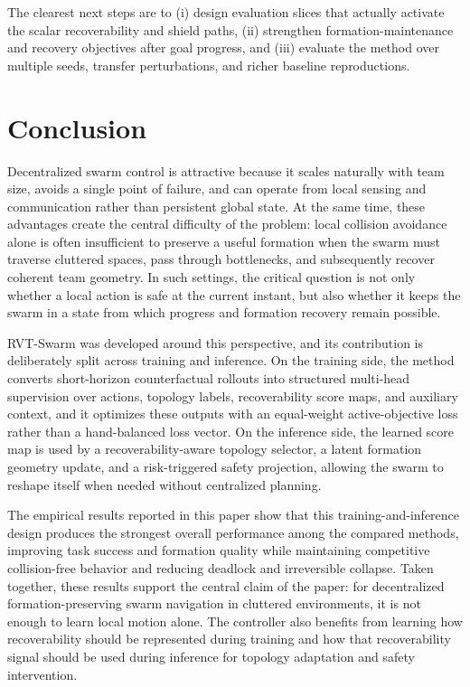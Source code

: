 \documentclass[journal]{IEEEtran}
\begin{document}
The clearest next steps are to (i) design evaluation slices that
actually activate the scalar recoverability and shield paths,
(ii) strengthen formation-maintenance and recovery objectives after goal
progress, and (iii) evaluate the method over multiple seeds, transfer
perturbations, and richer baseline reproductions.

\section{Conclusion}
\label{sec:conclusion}

Decentralized swarm control is attractive because it scales naturally
with team size, avoids a single point of failure, and can operate from
local sensing and communication rather than persistent global state.
At the same time, these advantages create the central difficulty of the
problem: local collision avoidance alone is often insufficient to
preserve a useful formation when the swarm must traverse cluttered
spaces, pass through bottlenecks, and subsequently recover coherent team
geometry. In such settings, the critical question is not only whether a
local action is safe at the current instant, but also whether it keeps
the swarm in a state from which progress and formation recovery remain
possible.

RVT-Swarm was developed around this perspective, and its contribution
is deliberately split across training and inference. On the training
side, the method converts short-horizon counterfactual rollouts into
structured multi-head supervision over actions, topology labels,
recoverability score maps, and auxiliary context, and it optimizes
these outputs with an equal-weight active-objective loss rather than a
hand-balanced loss vector. On the inference side, the learned score map
is used by a recoverability-aware topology selector, a latent formation
geometry update, and a risk-triggered safety projection, allowing the
swarm to reshape itself when needed without centralized planning.

The empirical results reported in this paper show that this
training-and-inference design produces the strongest overall
performance among the compared methods, improving task success and
formation quality while maintaining competitive collision-free behavior
and reducing deadlock and irreversible collapse. Taken together, these
results support the central claim of the paper: for decentralized
formation-preserving swarm navigation in cluttered environments, it is
not enough to learn local motion alone. The controller also benefits
from learning how recoverability should be represented during training
and how that recoverability signal should be used during inference for
topology adaptation and safety intervention.
\end{document}
